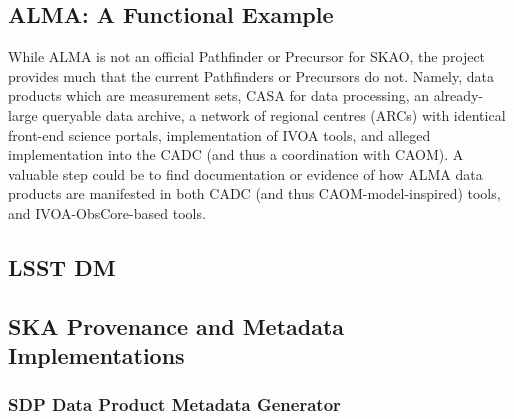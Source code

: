\subsection{ALMA: A Functional Example}
While ALMA is not an official Pathfinder or Precursor for SKAO, the project provides much that the current Pathfinders or Precursors do not. 
Namely, data products which are measurement sets, CASA for data processing, an already-large queryable data archive, a network of regional centres (ARCs) with identical front-end science portals, implementation of IVOA tools, and alleged implementation into the CADC (and thus a coordination with CAOM).  A valuable step could be to find documentation or evidence of how ALMA data products are manifested in both CADC (and thus CAOM-model-inspired) tools, and IVOA-ObsCore-based tools. 
\par

\subsection{LSST DM}


\subsection{SKA Provenance and Metadata Implementations}

\subsubsection{SDP Data Product Metadata Generator}

